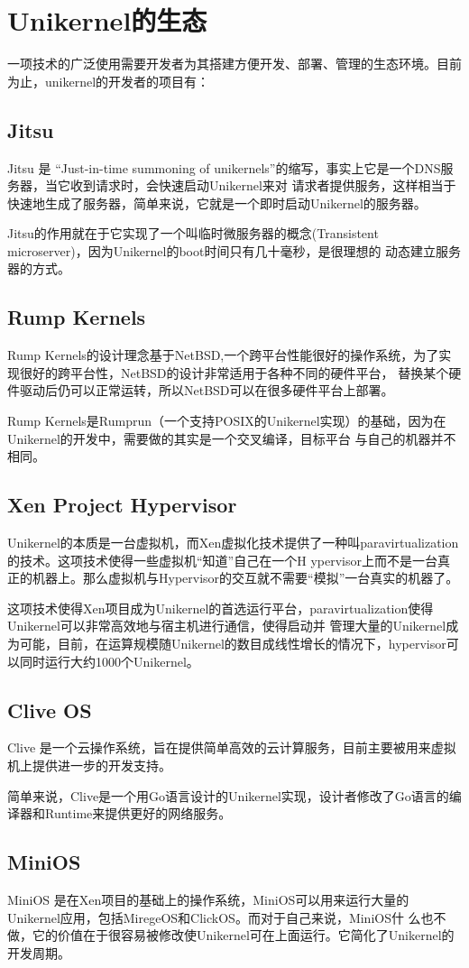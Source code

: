 \chapter{Unikernel的生态}

一项技术的广泛使用需要开发者为其搭建方便开发、部署、管理的生态环境。目前为止，unikernel的开发者的项目有：

\section{Jitsu}

Jitsu 是 “Just-in-time summoning of unikernels”的缩写，事实上它是一个DNS服务器，当它收到请求时，会快速启动Unikernel来对
请求者提供服务，这样相当于快速地生成了服务器，简单来说，它就是一个即时启动Unikernel的服务器。

Jitsu的作用就在于它实现了一个叫临时微服务器的概念(Transistent microserver)，因为Unikernel的boot时间只有几十毫秒，是很理想的
动态建立服务器的方式。

\section{Rump Kernels}

Rump Kernels的设计理念基于NetBSD,一个跨平台性能很好的操作系统，为了实现很好的跨平台性，NetBSD的设计非常适用于各种不同的硬件平台，
替换某个硬件驱动后仍可以正常运转，所以NetBSD可以在很多硬件平台上部署。

Rump Kernels是Rumprun（一个支持POSIX的Unikernel实现）的基础，因为在Unikernel的开发中，需要做的其实是一个交叉编译，目标平台
与自己的机器并不相同。

\section{Xen Project Hypervisor}

Unikernel的本质是一台虚拟机，而Xen虚拟化技术提供了一种叫paravirtualization的技术。这项技术使得一些虚拟机“知道”自己在一个H
ypervisor上而不是一台真正的机器上。那么虚拟机与Hypervisor的交互就不需要“模拟”一台真实的机器了。

这项技术使得Xen项目成为Unikernel的首选运行平台，paravirtualization使得Unikernel可以非常高效地与宿主机进行通信，使得启动并
管理大量的Unikernel成为可能，目前，在运算规模随Unikernel的数目成线性增长的情况下，hypervisor可以同时运行大约1000个Unikernel。

\section{Clive OS}

Clive 是一个云操作系统，旨在提供简单高效的云计算服务，目前主要被用来虚拟机上提供进一步的开发支持。

简单来说，Clive是一个用Go语言设计的Unikernel实现，设计者修改了Go语言的编译器和Runtime来提供更好的网络服务。

\section{MiniOS}

MiniOS 是在Xen项目的基础上的操作系统，MiniOS可以用来运行大量的Unikernel应用，包括MiregeOS和ClickOS。而对于自己来说，MiniOS什
么也不做，它的价值在于很容易被修改使Unikernel可在上面运行。它简化了Unikernel的开发周期。